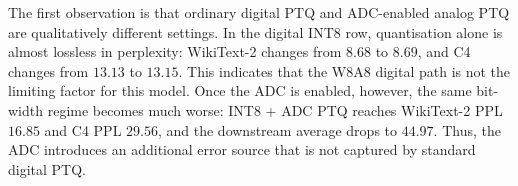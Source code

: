 \documentclass[a4paper,11pt,oneside]{article}
\theoremstyle{breakstyle}
\begin{document}
  \begin{table}[htbp]
    \centering
    \caption{Main results on Llama-3.2-1B.}
    \label{tab:main_results}
    \renewcommand{\arraystretch}{1.2}
    \setlength{\tabcolsep}{3.2pt}
  \end{table}

  The first observation is that ordinary digital PTQ and ADC-enabled
  analog PTQ are qualitatively different settings.  In the digital
  INT8 row, quantisation alone is almost lossless in perplexity:
  WikiText-2 changes from $8.68$ to $8.69$, and C4 changes from $13.13$
  to $13.15$.  This indicates that the W8A8 digital path is not the
  limiting factor for this model.  Once the ADC is enabled, however, the
  same bit-width regime becomes much worse: INT8 + ADC PTQ reaches
  WikiText-2 PPL $16.85$ and C4 PPL $29.56$, and the downstream average
  drops to $44.97$.  Thus, the ADC introduces an additional error source
  that is not captured by standard digital PTQ.
\end{document}

